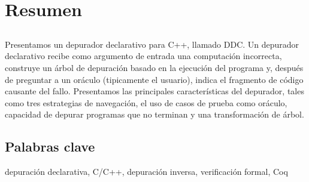 \chapter*{Resumen}

\section*{\tituloPortadaVal}

Presentamos un depurador declarativo para C++, llamado DDC. Un depurador declarativo recibe como argumento de entrada una computación incorrecta, construye un árbol de depuración basado en la ejecución del programa y, después de preguntar a un oráculo (tipicamente el usuario), indica el fragmento de código causante del fallo. Presentamos las principales características del depurador, tales como tres estrategias de navegación, el uso de casos de prueba como oráculo, capacidad de depurar programas que no terminan y una transformación de árbol. 

\section*{Palabras clave}
   
\noindent depuración declarativa, C/C++, depuración inversa, verificación formal, Coq

   


